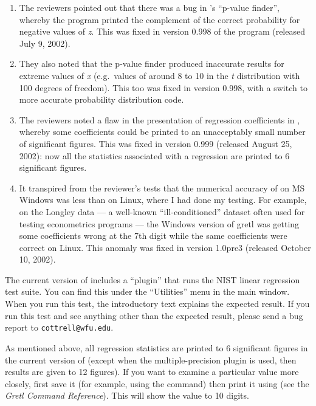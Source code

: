 \begin{enumerate}
\item The reviewers pointed out that there was a bug in 's
  ``p-value finder'', whereby the program printed the complement of
  the correct probability for negative values of \emph{z}.  This was
  fixed in version 0.998 of the program (released July 9, 2002).
\item They also noted that the p-value finder produced inaccurate
  results for extreme values of \emph{x} (e.g.\ values of around 8 to
  10 in the \emph{t} distribution with 100 degrees of freedom).  This
  too was fixed in  version 0.998, with a switch to more
  accurate probability distribution code.
\item The reviewers noted a flaw in the presentation of regression
  coefficients in , whereby some coefficients could be
  printed to an unacceptably small number of significant figures.
  This was fixed in version 0.999 (released August 25, 2002): now all
  the statistics associated with a regression are printed to 6
  significant figures.
\item It transpired from the reviewer's tests that the numerical
  accuracy of  on MS Windows was less than on Linux, where
  I had done my testing.  For example, on the Longley data --- a
  well-known ``ill-conditioned'' dataset often used for testing
  econometrics programs --- the Windows version of gretl was getting
  some coefficients wrong at the 7th digit while the same coefficients
  were correct on Linux.  This anomaly was fixed in 
  version 1.0pre3 (released October 10, 2002).
\end{enumerate}

The current version of  includes a ``plugin'' that runs the
NIST linear regression test suite.  You can find this under the
``Utilities'' menu in the main window.  When you run this test, the
introductory text explains the expected result.  If you run this test
and see anything other than the expected result, please send a bug
report to \verb+cottrell@wfu.edu+.  

As mentioned above, all regression statistics are printed to 6
significant figures in the current version of  (except when
the multiple-precision plugin is used, then results are given to 12
figures).  If you want to examine a particular value more closely,
first save it (for example, using the  command) then print
it using  (see the \emph{Gretl Command Reference}).
This will show the value to 10 digits.

